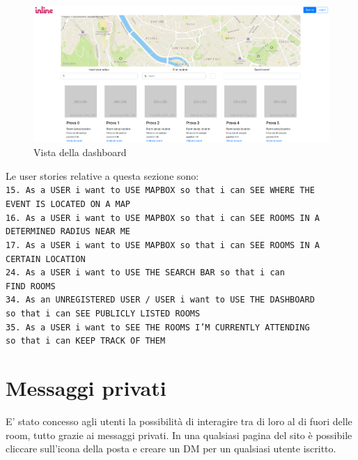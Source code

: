 	\begin{figure}[H]
		\includegraphics[width=\columnwidth]{./media/dashboard.png}
		\caption{Vista della dashboard}
	\end{figure}

	Le user stories relative a questa sezione sono:\\
	\texttt{15. As a USER i want to USE MAPBOX so that i can SEE WHERE THE \\ EVENT IS LOCATED ON A MAP}\\
	\texttt{16. As a USER i want to USE MAPBOX so that i can SEE ROOMS IN A \\ DETERMINED RADIUS NEAR ME}\\
	\texttt{17. As a USER i want to USE MAPBOX so that i can SEE ROOMS IN A \\ CERTAIN LOCATION}\\
	\texttt{24. As a USER i want to USE THE SEARCH BAR so that i can \\ FIND ROOMS}\\
	\texttt{34. As an UNREGISTERED USER / USER i want to USE THE DASHBOARD\\ so that i can SEE PUBLICLY LISTED ROOMS}\\
	\texttt{35. As a USER i want to SEE THE ROOMS I’M CURRENTLY ATTENDING \\ so that i can KEEP TRACK OF THEM}\\
	
	\section{Messaggi privati}
	E' stato concesso agli utenti la possibilità di interagire tra di loro al di fuori delle room, tutto grazie ai messaggi privati. 
	In una qualsiasi pagina del sito è possibile cliccare sull'icona della posta e creare un DM per un qualsiasi utente iscritto.
	
